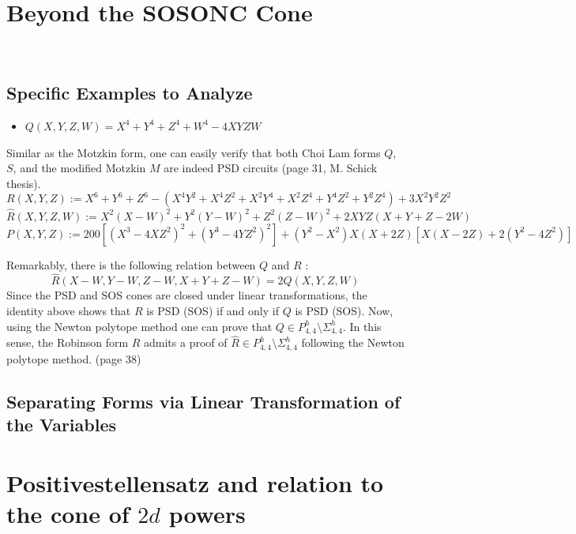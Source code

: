 \documentclass{article}
\begin{document}
\section{Beyond the SOSONC Cone}
\label{s04}~~
\subsection{Specific Examples to Analyze}
\begin{itemize}
    \item $Q(X,Y,Z,W) = X^4 + Y^4 + Z^4 + W^4 - 4XYZW$
\end{itemize}

Similar as the Motzkin form, one can easily verify that both Choi Lam forms $Q$, $S$, and the modified Motzkin $M$ are indeed 
PSD circuits (page 31, M. Schick thesis).
\[
    R(X,Y,Z) := X^6 + Y^6 + Z^6 - (X^4 Y^2 + X^4 Z^2 + X^2 Y^4 + X^2 Z^4 + Y^4 Z^2 + Y^2 Z^4)
    + 3X^2 Y^2 Z^2
\]
\[
    \hat{R}(X,Y,Z,W) := X^2(X-W)^2 + Y^2(Y-W)^2 + Z^2(Z-W)^2 + 2XYZ(X+Y+Z-2W)
\]
\[
    P(X,Y,Z) := 200 \left[ (X^3-4XZ^2)^2 + (Y^3-4YZ^2)^2 \right] + (Y^2-X^2)X(X+2Z)\left[ X(X-2Z)+2(Y^2-4Z^2) \right]
\]

Remarkably, there is the following relation between $Q$ and $R$ \cite[see page 5]{Rez07}:
\[
    \hat{R}(X-W, Y-W, Z-W, X+Y+Z-W) = 2Q(X,Y,Z,W)
\]
Since the PSD and SOS cones are closed under linear transformations, the identity above shows that $R$ is PSD (SOS) 
if and only if $Q$ is PSD (SOS). Now, using the Newton polytope method one can prove that 
$Q \in P^h_{4,4} \setminus \Sigma^h_{4,4}$. In this sense, the Robinson form $R$ admits a proof of 
$\hat{R} \in P^h_{4,4} \setminus \Sigma^h_{4,4}$ following the Newton polytope method. (page 38)

\subsection{Separating Forms via Linear Transformation of the Variables}

\section{Positivestellensatz and relation to the cone of $2d$ powers}
\label{s05}
~~
\end{document}
